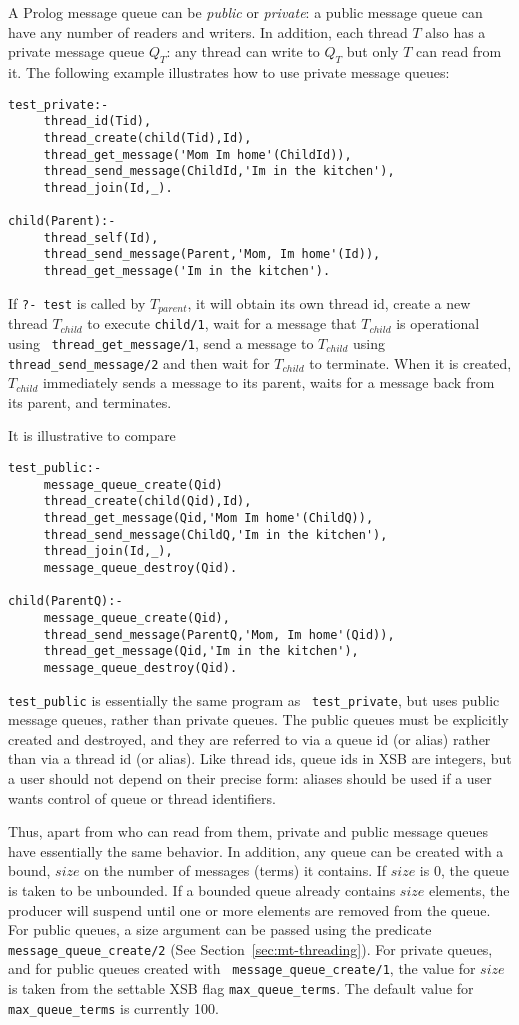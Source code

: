 A Prolog message queue can be {\em public} or {\em private}: a public
message queue can have any number of readers and writers.  In
addition, each thread $T$ also has a private message queue $Q_{T}$:
any thread can write to $Q_{T}$ but only $T$ can read from it.  The
following example illustrates how to use private message queues:
%
\begin{verbatim}
test_private:- 
     thread_id(Tid),
     thread_create(child(Tid),Id),
     thread_get_message('Mom Im home'(ChildId)),
     thread_send_message(ChildId,'Im in the kitchen'),
     thread_join(Id,_).

child(Parent):- 
     thread_self(Id),
     thread_send_message(Parent,'Mom, Im home'(Id)),
     thread_get_message('Im in the kitchen').
\end{verbatim}
%
If {\tt ?- test} is called by $T_{parent}$, it will obtain its own
thread id, create a new thread $T_{child}$ to execute {\tt child/1},
wait for a message that $T_{child}$ is operational using {\tt
  thread\_get\_message/1}, send a message to $T_{child}$ using {\tt
  thread\_send\_message/2} and then wait for $T_{child}$ to terminate.
  When it is created, $T_{child}$ immediately sends a message to its
  parent, waits for a message back from its parent, and terminates.
%

It is illustrative to compare 
\begin{verbatim}
test_public:- 
     message_queue_create(Qid)
     thread_create(child(Qid),Id),
     thread_get_message(Qid,'Mom Im home'(ChildQ)),
     thread_send_message(ChildQ,'Im in the kitchen'),
     thread_join(Id,_),
     message_queue_destroy(Qid).

child(ParentQ):- 
     message_queue_create(Qid),
     thread_send_message(ParentQ,'Mom, Im home'(Qid)),
     thread_get_message(Qid,'Im in the kitchen'),
     message_queue_destroy(Qid).
\end{verbatim}
%
{\tt test\_public} is essentially the same program as {\tt
  test\_private}, but uses public message queues, rather than private
queues.  The public queues must be explicitly created and destroyed,
and they are referred to via a queue id (or alias) rather than via a
thread id (or alias).  Like thread ids, queue ids in XSB are integers,
but a user should not depend on their precise form: aliases should be
used if a user wants control of queue or thread identifiers.

Thus, apart from who can read from them, private and public message
queues have essentially the same behavior.  In addition, any queue can
be created with a bound, $size$ on the number of messages (terms) it
contains.  If $size$ is 0, the queue is taken to be unbounded.  If a
bounded queue already contains $size$ elements, the producer will
suspend until one or more elements are removed from the queue.  For
public queues, a size argument can be passed using the predicate {\tt
  message\_queue\_create/2} (See Section~\ref{sec:mt-threading}).  For
private queues, and for public queues created with {\tt
  message\_queue\_create/1}, the value for $size$ is taken from the
settable XSB flag {\tt max\_queue\_terms}.  The default value for {\tt
  max\_queue\_terms} is currently 100.

